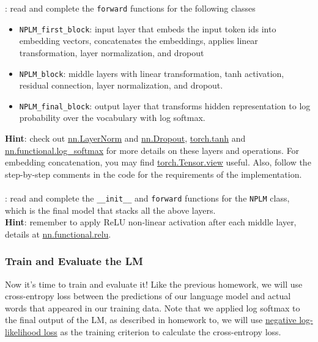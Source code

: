 \noindent\todo{}: read and complete the \texttt{forward} functions for the following classes
\begin{itemize}
    \item \texttt{NPLM\_first\_block}: input layer that embeds the input token ids into embedding vectors, concatenates the embeddings, applies linear transformation, layer normalization, and dropout 
    \item \texttt{NPLM\_block}: middle layers with linear transformation, tanh activation, residual connection, layer normalization, and dropout.
    \item \texttt{NPLM\_final\_block}: output layer that transforms hidden representation to log probability over the vocabulary with log softmax.
\end{itemize}
\textbf{Hint}: check out \href{https://pytorch.org/docs/stable/generated/torch.nn.LayerNorm.html}{nn.LayerNorm} and \href{https://pytorch.org/docs/stable/generated/torch.nn.Dropout.html}{nn.Dropout}, \href{https://pytorch.org/docs/stable/generated/torch.tanh.html}{torch.tanh} and \href{https://pytorch.org/docs/stable/generated/torch.nn.functional.log_softmax.html}{nn.functional.log\_softmax} for more details on these layers and operations. For embedding concatenation, you may find \href{https://pytorch.org/docs/stable/generated/torch.Tensor.view.html}{torch.Tensor.view} useful. Also, follow the step-by-step comments in the code for the requirements of the implementation.
\\\\
\noindent\todo{}: read and complete the \texttt{\_\_init\_\_} and \texttt{forward} functions for the \texttt{NPLM} class, which is the final model that stacks all the above layers.\\
\noindent \textbf{Hint}: remember to apply ReLU non-linear activation after each middle layer, details at \href{https://pytorch.org/docs/stable/generated/torch.nn.functional.relu.html}{nn.functional.relu}.
\subsubsection{Train and Evaluate the LM}
Now it's time to train and evaluate it! Like the previous homework, we will use cross-entropy loss between the predictions of our language model and actual words that appeared in our training data. Note that we applied log softmax to the final output of the LM, as described in homework to, we will use \href{https://pytorch.org/docs/stable/generated/torch.nn.NLLLoss.html#torch.nn.NLLLoss}{negative log-likelihood loss} as the training criterion to calculate the cross-entropy loss.

